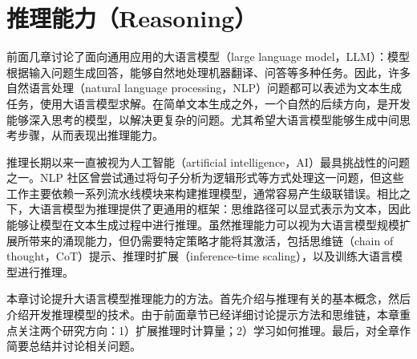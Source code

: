 
%




\chapter{推理能力（Reasoning）}

\thispagestyle{chapterurl} %

前面几章讨论了面向通用应用的大语言模型（large language model，LLM）：模型根据输入问题生成回答，能够自然地处理机器翻译、问答等多种任务。因此，许多自然语言处理（natural language processing，NLP）问题都可以表述为文本生成任务，使用大语言模型求解。在简单文本生成之外，一个自然的后续方向，是开发能够深入思考的模型，以解决更复杂的问题。尤其希望大语言模型能够生成中间思考步骤，从而表现出推理能力。

推理长期以来一直被视为人工智能（artificial intelligence，AI）最具挑战性的问题之一。NLP 社区曾尝试通过将句子分析为逻辑形式等方式处理这一问题，但这些工作主要依赖一系列流水线模块来构建推理模型，通常容易产生级联错误。相比之下，大语言模型为推理提供了更通用的框架：思维路径可以显式表示为文本，因此能够让模型在文本生成过程中进行推理。虽然推理能力可以视为大语言模型规模扩展所带来的涌现能力，但仍需要特定策略才能将其激活，包括思维链（chain of thought，CoT）提示、推理时扩展（inference-time scaling），以及训练大语言模型进行推理。

本章讨论提升大语言模型推理能力的方法。首先介绍与推理有关的基本概念，然后介绍开发推理模型的技术。由于前面章节已经详细讨论提示方法和思维链，本章重点关注两个研究方向：1）扩展推理时计算量；2）学习如何推理。最后，对全章作简要总结并讨论相关问题。

